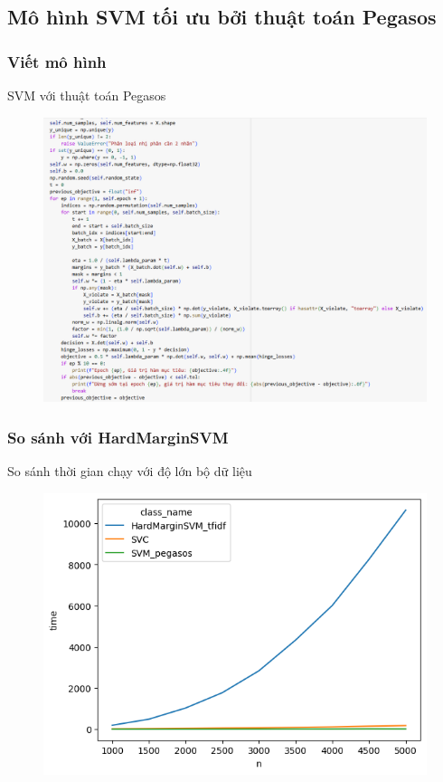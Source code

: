 \documentclass[serif, aspectratio=169]{beamer}
\begin{document}
	\subsection{Mô hình SVM tối ưu bởi thuật toán Pegasos}
	\subsubsection{Viết mô hình}
	\begin{frame}{SVM với thuật toán Pegasos}
		\begin{figure}
			\centering
			\includegraphics[width=0.6\linewidth]{pic/svm-pegasus.png}
			\label{fig:svm-pegasus}
		\end{figure}
	\end{frame}
	\subsubsection{So sánh với HardMarginSVM}
	\begin{frame}{So sánh thời gian chạy với độ lớn bộ dữ liệu}
		\begin{figure}
			\centering
			\includegraphics[width=0.6\linewidth]{pic/hardmargin-vs-pegasos-n-time.png}
			\label{fig:hardmargin-vs-pegasos-n-time.}
		\end{figure}
	\end{frame}
	
\end{document}

